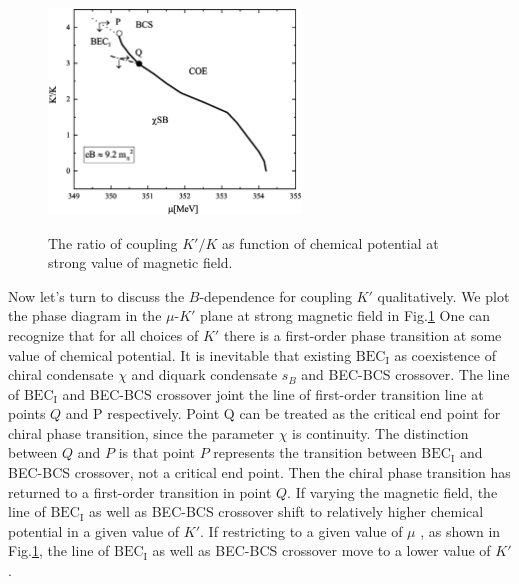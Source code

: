 \documentclass[prd, showpacs,nofootinbib,amsmath,amssymb,12pt]{revtex4}
\begin{document}
\begin{figure}[h]
\caption{  The ratio of  coupling $K'/K$ as  function of chemical potential at strong value of magnetic field.}
\centering
\includegraphics[width=0.6\textwidth]{kmu.eps}
\label{fig:kmu}
\end{figure}

Now let's turn to discuss the $B$-dependence for coupling $K'$ qualitatively.
We plot the phase diagram in the $\mu$-$K'$ plane at strong magnetic field in Fig.\ref{fig:kmu}
 One can recognize that for all choices of $K'$ there is  a first-order phase transition at some value of chemical potential.
  It is inevitable that existing $\text{BEC}_\text{I}$ as coexistence of chiral condensate $\chi$ and diquark condensate $s_B$ and BEC-BCS crossover.
 The line of $\text{BEC}_\text{I}$ and BEC-BCS crossover joint the line of first-order transition line at points $Q$ and P respectively.
 Point Q can be treated as the critical end point for chiral phase transition, since the parameter $\chi$
 is continuity.
 The distinction between $Q$ and $P$ is that point $P$ represents the transition between  $\text{BEC}_\text{I}$ and BEC-BCS crossover, not a critical end point.
 Then the chiral phase transition has returned to a first-order transition in point $Q$. 
If varying the magnetic field, the line of $\text{BEC}_\text{I}$ as well as  BEC-BCS crossover
shift to  relatively higher chemical potential in  a given value of $K'$.
If restricting to a given value of $\mu$ ,
as shown in Fig.\ref{fig:kmu}, the line of $\text{BEC}_\text{I}$ as well as  BEC-BCS crossover move to a lower value of $K'$.



\end{document}
